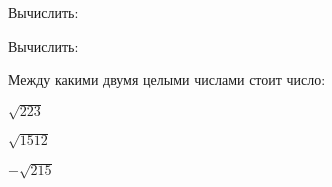 \begin{class}[number=3]
\begin{listofex}
\begin{enumcols}[itemcolumns=2]
		\end{enumcols}
		\item Вычислить:
		\begin{enumcols}[itemcolumns=3]
			\item {}
			\item {}
			\item {}
			\item {}
			\item {}
			\item {}
		\end{enumcols}
		\item Вычислить:
		\begin{enumcols}[itemcolumns=3]
			\item {}
			\item {}
			\item {}
			\item {}
			\item {}
			\item {}
			\item {}
		\end{enumcols}
		\item Между какими двумя целыми числами стоит число:
		\begin{enumcols}[itemcolumns=3]
			\item \( \sqrt{223} \)
			\item \( \sqrt{1512} \)
			\item \( -\sqrt{215} \)
		\end{enumcols}
	\end{listofex}
\end{class}
%
%
